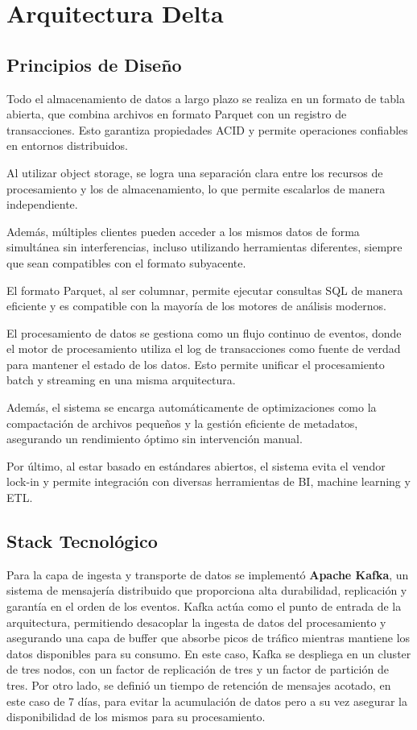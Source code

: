 \section{Arquitectura Delta}

\subsection{Principios de Diseño}

Todo el almacenamiento de datos a largo plazo se realiza en un formato de tabla abierta, 
que combina archivos en formato Parquet con un registro de transacciones. 
Esto garantiza propiedades ACID y permite operaciones confiables en entornos distribuidos. 

Al utilizar object storage, se logra una separación clara entre los recursos de procesamiento y los de almacenamiento, 
lo que permite escalarlos de manera independiente. 

Además, múltiples clientes pueden acceder a los mismos datos de forma simultánea sin interferencias, 
incluso utilizando herramientas diferentes, siempre que sean compatibles con el formato subyacente.

El formato Parquet, al ser columnar, permite ejecutar consultas SQL de manera eficiente 
y es compatible con la mayoría de los motores de análisis modernos. 

El procesamiento de datos se gestiona como un flujo continuo de eventos, 
donde el motor de procesamiento utiliza el log de transacciones como fuente de verdad para mantener el estado de los datos. 
Esto permite unificar el procesamiento batch y streaming en una misma arquitectura. 

Además, el sistema se encarga automáticamente de optimizaciones como la compactación de archivos pequeños
y la gestión eficiente de metadatos, asegurando un rendimiento óptimo sin intervención manual.

Por último, al estar basado en estándares abiertos, el sistema evita el vendor lock-in 
y permite integración con diversas herramientas de BI, machine learning y ETL.

\subsection{Stack Tecnológico}
Para la capa de ingesta y transporte de datos se implementó \textbf{Apache Kafka}, 
un sistema de mensajería distribuido que proporciona alta durabilidad, replicación y garantía en el orden de los eventos. 
Kafka actúa como el punto de entrada de la arquitectura, permitiendo desacoplar la ingesta de datos del procesamiento 
y asegurando una capa de buffer que absorbe picos de tráfico mientras mantiene los datos disponibles para su consumo.
En este caso, Kafka se despliega en un cluster de tres nodos, con un factor de replicación de tres y un factor de partición de tres.
Por otro lado, se definió un tiempo de retención de mensajes acotado, en este caso de 7 días, para evitar la acumulación de datos
pero a su vez asegurar la disponibilidad de los mismos para su procesamiento.

